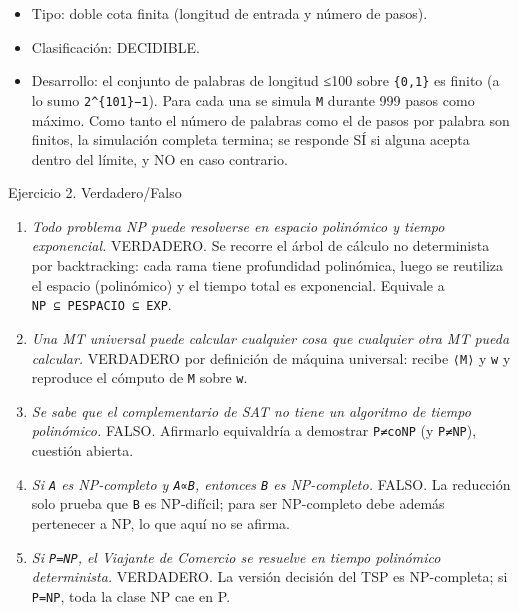 \documentclass[12pt]{book} %
\providecommand{\tightlist}{%
  \setlength{\itemsep}{0pt}\setlength{\parskip}{0pt}}
\begin{document}
\begin{enumerate}
  \begin{itemize}
  \tightlist
  \item
    Tipo: doble cota finita (longitud de entrada y número de pasos).
  \item
    Clasificación: DECIDIBLE.
  \item
    Desarrollo: el conjunto de palabras de longitud ≤100 sobre
    \texttt{\{0,1\}} es finito (a lo sumo \texttt{2\^{}\{101\}−1}). Para
    cada una se simula \texttt{M} durante 999 pasos como máximo. Como
    tanto el número de palabras como el de pasos por palabra son
    finitos, la simulación completa termina; se responde SÍ si alguna
    acepta dentro del límite, y NO en caso contrario.
  \end{itemize}
\end{enumerate}

Ejercicio 2. Verdadero/Falso

\begin{enumerate}
\def\labelenumi{\arabic{enumi}.}
\tightlist
\item
  \emph{Todo problema NP puede resolverse en espacio polinómico y tiempo
  exponencial.} VERDADERO. Se recorre el árbol de cálculo no
  determinista por backtracking: cada rama tiene profundidad polinómica,
  luego se reutiliza el espacio (polinómico) y el tiempo total es
  exponencial. Equivale a \texttt{NP\ ⊆\ PESPACIO\ ⊆\ EXP}.
\item
  \emph{Una MT universal puede calcular cualquier cosa que cualquier
  otra MT pueda calcular.} VERDADERO por definición de máquina
  universal: recibe \texttt{⟨M⟩} y \texttt{w} y reproduce el cómputo de
  \texttt{M} sobre \texttt{w}.
\item
  \emph{Se sabe que el complementario de SAT no tiene un algoritmo de
  tiempo polinómico.} FALSO. Afirmarlo equivaldría a demostrar
  \texttt{P≠coNP} (y \texttt{P≠NP}), cuestión abierta.
\item
  \emph{Si \texttt{A} es NP-completo y \texttt{A∝B}, entonces \texttt{B}
  es NP-completo.} FALSO. La reducción solo prueba que \texttt{B} es
  NP-difícil; para ser NP-completo debe además pertenecer a NP, lo que
  aquí no se afirma.
\item
  \emph{Si \texttt{P=NP}, el Viajante de Comercio se resuelve en tiempo
  polinómico determinista.} VERDADERO. La versión decisión del TSP es
  NP-completa; si \texttt{P=NP}, toda la clase NP cae en P.
\end{enumerate}
\end{document}
